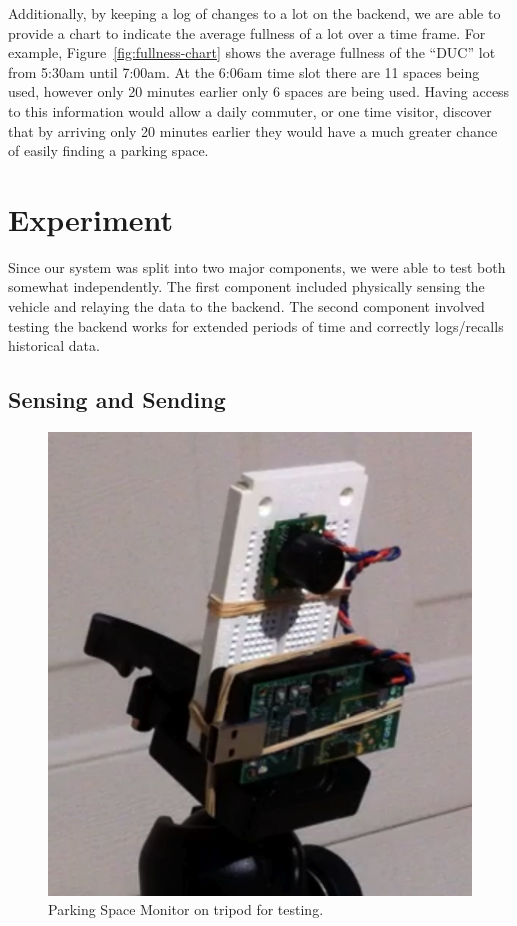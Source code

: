 \documentclass{acm_proc}
\begin{document}
Additionally, by keeping a log of changes to a lot on the backend, we are
able to provide a chart to indicate the average fullness of a lot over a
time frame.
For example, Figure~\ref{fig:fullness-chart} shows the average fullness of
the ``DUC'' lot from 5:30am until 7:00am.
At the 6:06am time slot there are 11 spaces being used, however only 20
minutes earlier only 6 spaces are being used.
Having access to this information would allow a daily commuter, or one time
visitor, discover that by arriving only 20 minutes earlier they would have
a much greater chance of easily finding a parking space.

\section{Experiment}\label{sec:experiment}

Since our system was split into two major components, we were able to test
both somewhat independently. 
The first component included physically sensing the vehicle and relaying
the data to the backend.
The second component involved testing the backend works for extended
periods of time and correctly logs/recalls historical data.

\subsection{Sensing and Sending}

\begin{figure}[h]
    \begin{center}
		\includegraphics[width=\columnwidth]{figures/parking_sensor}
	\end{center}
	\caption{Parking Space Monitor on tripod for testing.}
	\label{fig:parking_sensor}
\end{figure}
\end{document}
